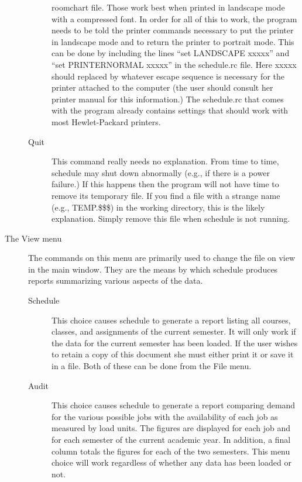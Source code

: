 \begin{description}
\begin{description}
roomchart file. Those work best when printed in landscape mode with a
compressed font. In order for all of this to work, the program needs to
be told the printer commands necessary to put the printer in landscape mode
and to return the printer to portrait mode. This can be done by including
the lines ``set LANDSCAPE xxxxx'' and ``set PRINTERNORMAL xxxxx'' in the
schedule.rc file. Here xxxxx should replaced by whatever escape sequence is
necessary for the printer attached to the computer (the user should consult
her printer manual for this information.) The schedule.rc that comes with
the program already contains settings that should work with most Hewlet-Packard
printers. 
\item[Quit] This command really needs no explanation. From time to time,
schedule may shut down abnormally (e.g., if there is a power failure.) If this
happens then the program will not have time to remove its temporary file. If
you find a file with a strange name (e.g., TEMP.\$\$\$) in the working
directory, this is the likely explanation. Simply remove this file when
schedule is not running.
\end{description}
\item[The View menu]
The commands on this menu are primarily used to change the file on view in
the main window. They are the means by which schedule produces reports 
summarizing various aspects of the data.
\begin{description}
\item[Schedule] This choice causes schedule to generate a report listing all
courses, classes, and assignments of the current semester. It will only work
if the data for the current semester has been loaded. If the user wishes to
retain a copy of this document she must either print it or save it in a file.
Both of these can be done from the File menu.
\item[Audit] This choice causes schedule to generate a report comparing 
demand for the various possible jobs with the availability of each job as
measured by load units. The figures are displayed for each job and for
each semester of the current academic year. In addition, a final column 
totals the figures for each of the two semesters. This menu choice will
work regardless of whether any data has been loaded or not.


\end{description}
\end{description}
